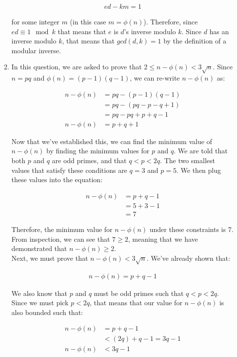 \documentclass[11pt]{article}
\theoremstyle{definition}
\begin{document}
\begin{enumerate}
\begin{enumerate}
\begin{align*}
    ed - km = 1
\end{align*}

for some integer $m$ (in this case $m = \phi(n)$). Therefore, since $ed \equiv 1 \mod{k}$ that means that $e$ is $d$'s inverse modulo $k$. Since $d$ has an inverse modulo $k$, that means that $gcd(d, k) = 1$ by the definition of a modular inverse.
\\

\item %
In this question, we are asked to prove that $2 \leq n - \phi(n) < 3\sqrt{n}$. Since $n = pq$ and $\phi(n) = (p-1)(q-1)$, we can re-write $n - \phi(n)$ as:

\begin{align*}
    n - \phi(n) &= pq - (p - 1)(q - 1) \\
    &= pq - (pq - p - q + 1) \\
    &= pq - pq + p + q - 1 \\
    n - \phi(n) &= p + q + 1
\end{align*}

Now that we've established this, we can find the minimum value of $n - \phi(n)$ by finding the minimum values for $p$ and $q$. We are told that both $p$ and $q$ are odd primes, and that $q < p < 2q$. The two smallest values that satisfy these conditions are $q = 3$ and $p = 5$. We then plug these values into the equation:

\begin{align*}
    n - \phi(n) &= p + q - 1 \\
    &= 5 + 3 - 1 \\
    &= 7
\end{align*}

Therefore, the minimum value for $n - \phi(n)$ under these constraints is 7. From inspection, we can see that $7 \geq 2$, meaning that we have demonstrated that $n - \phi(n) \geq 2$.
\\

Next, we must prove that $n - \phi(n) < 3\sqrt{n}$. We've already shown that:

\begin{align*}
    n - \phi(n) = p + q - 1
\end{align*}

We also know that $p$ and $q$ must be odd primes such that $q < p < 2q$. Since we must pick $p < 2q$, that means that our value for $n - \phi(n)$ is also bounded such that:

\begin{align*}
    n - \phi(n) &= p + q - 1 \\
    &< (2q) + q - 1  = 3q - 1\\
    n - \phi(n) &< 3q - 1
\end{align*}


\end{enumerate}
\end{enumerate}
\end{document}
